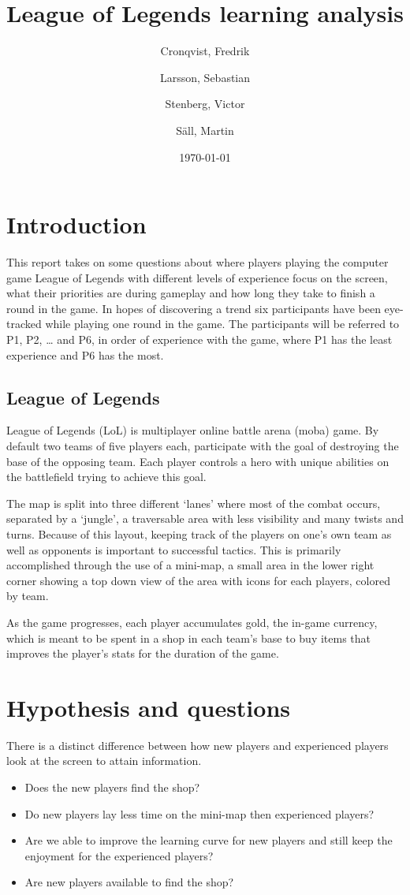 \documentclass{report}
\author{Cronqvist, Fredrik \and Larsson, Sebastian \and Stenberg, Victor \and S\"{a}ll, Martin}
\date{\today}
\title{League of Legends learning analysis}
\begin{document}
\maketitle

\chapter{Introduction}
This report takes on some questions about where players playing the computer game League of Legends with different levels of experience focus on the screen, what their priorities are during gameplay and how long they take to finish a round in the game. In hopes of discovering a trend six participants have been eye-tracked while playing one round in the game. The participants will be referred to P1, P2, … and P6, in order of experience with the game, where P1 has the least experience and P6 has the most.

\section{League of Legends}
League of Legends (LoL) is multiplayer online battle arena (moba) game. By default two teams of five players each, participate with the goal of destroying the base of the opposing team. Each player controls a hero with unique abilities on the battlefield trying to achieve this goal.

The map is split into three different `lanes' where most of the combat occurs, separated by a `jungle', a traversable area with less visibility and many twists and turns. Because of this layout, keeping track of the players on one's own team as well as opponents is important to successful tactics. This is primarily accomplished through the use of a mini-map, a small area in the lower right corner showing a top down view of the area with icons for each players, colored by team.

As the game progresses, each player accumulates gold, the in-game currency, which is meant to be spent in a shop in each team's base to buy items that improves the player's stats for the duration of the game.

\chapter{Hypothesis and questions}
There is a distinct difference between how new players and experienced players look at the screen to attain information.

\begin{itemize}
\item Does the new players find the shop?
\item Do new players lay less time on the mini-map then experienced players?
\item Are we able to improve the learning curve for new players and still keep the enjoyment for the experienced players?
\item Are new players available to find the shop?
\end{itemize}
\end{document}
